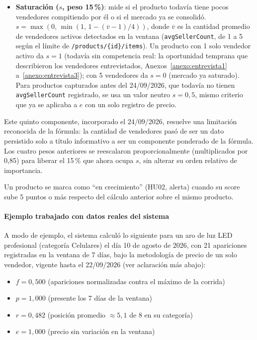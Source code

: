 \begin{itemize}
	\item \textbf{Saturación ($s$, peso 15\,\%)}: mide si el producto todavía tiene pocos vendedores compitiendo por él o si el mercado ya se consolidó. $s = \max(0,\, \min(1,\, 1 - (\overline{v} - 1)/4))$, donde $\overline{v}$ es la cantidad promedio de vendedores activos detectados en la ventana (\texttt{avgSellerCount}, de 1 a 5 según el límite de \texttt{/products/\{id\}/items}). Un producto con 1 solo vendedor activo da $s=1$ (todavía sin competencia real: la oportunidad temprana que describieron los vendedores entrevistados, Anexos~\ref{anexo:entrevista1} a~\ref{anexo:entrevista3}); con 5 vendedores da $s=0$ (mercado ya saturado). Para productos capturados antes del 24/09/2026, que todavía no tienen \texttt{avgSellerCount} registrado, se usa un valor neutro $s=0{,}5$, mismo criterio que ya se aplicaba a $e$ con un solo registro de precio.
\end{itemize}

Este quinto componente, incorporado el 24/09/2026, resuelve una limitación reconocida de la fórmula: la cantidad de vendedores pasó de ser un dato persistido solo a título informativo a ser un componente ponderado de la fórmula. Los cuatro pesos anteriores se reescalaron proporcionalmente (multiplicados por 0,85) para liberar el 15\,\% que ahora ocupa $s$, sin alterar su orden relativo de importancia.

Un producto se marca como ``en crecimiento'' (HU02, alerta) cuando su score sube 5 puntos o más respecto del cálculo anterior sobre el mismo producto.

\paragraph*{Ejemplo trabajado con datos reales del sistema}

A modo de ejemplo, el sistema calculó lo siguiente para un aro de luz LED profesional (categoría Celulares) el día 10 de agosto de 2026, con 21 apariciones registradas en la ventana de 7 días, bajo la metodología de precio de un solo vendedor, vigente hasta el 22/09/2026 (ver aclaración más abajo):

\begin{itemize}
	\item $f = 0{,}500$ (apariciones normalizadas contra el máximo de la corrida)
	\item $p = 1{,}000$ (presente los 7 días de la ventana)
	\item $r = 0{,}482$ (posición promedio $\approx 5{,}1$ de 8 en su categoría)
	\item $e = 1{,}000$ (precio sin variación en la ventana)
\end{itemize}

